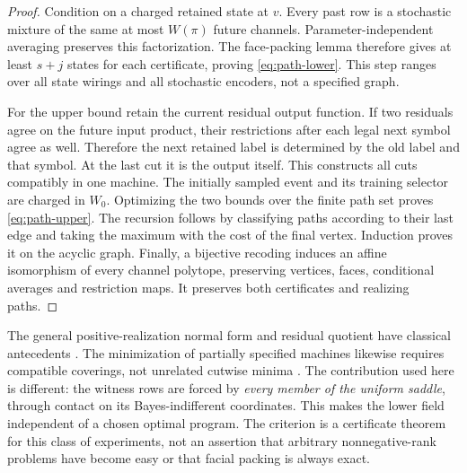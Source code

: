 \begin{proof}
Condition on a charged retained state at $v$. Every past row is a
stochastic mixture of the same at most $W(\pi)$ future channels.
Parameter-independent averaging preserves this factorization.
The face-packing lemma therefore gives at least $s+j$ states for each
certificate, proving \eqref{eq:path-lower}. This step ranges over
all state wirings and all stochastic encoders, not a specified graph.

For the upper bound retain the current residual output function.
If two residuals agree on the future input product, their restrictions
after each legal next symbol agree as well. Therefore the next retained
label is determined by the old label and that symbol. At the last cut
it is the output itself. This constructs all cuts compatibly in one
machine. The initially sampled event and its training selector are
charged in $W_0$. Optimizing the two bounds over the finite path set
proves \eqref{eq:path-upper}. The recursion follows by classifying
paths according to their last edge and taking the maximum with the
cost of the final vertex. Induction proves it on the acyclic graph.
Finally, a bijective recoding induces an affine isomorphism of every
channel polytope, preserving vertices, faces, conditional averages and
restriction maps. It preserves both certificates and realizing paths.
\end{proof}

The general positive-realization normal form and residual quotient have
classical antecedents \cite{Heller,Vidyasagar,GG}. The minimization of
partially specified machines likewise requires compatible coverings,
not unrelated cutwise minima \cite{Reusch}. The contribution used here
is different: the witness rows are forced by \emph{every member of the
uniform saddle}, through contact on its Bayes-indifferent coordinates.
This makes the lower field independent of a chosen optimal program.
The criterion is a certificate theorem for this class of experiments,
not an assertion that arbitrary nonnegative-rank problems have become
easy or that facial packing is always exact.
